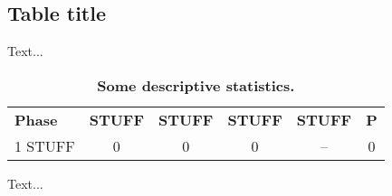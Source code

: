 \subsection{Table title}

Text...  

\begin{table}
\begin{center}
\begin{tabular}{lccccc}
\hline
\textbf{Phase}        & \textbf{STUFF} & \textbf{STUFF}  & \textbf{STUFF} &  \textbf{STUFF} & \textbf{P} \\   
1 STUFF           & 0      & 0     & 0    & --   & 0   \\            

\hline
\end{tabular}
\end{center}
\caption{\textbf{Some descriptive statistics.}}
\end{table}

Text... 
